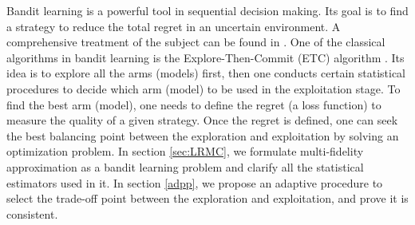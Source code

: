 \documentclass[a4paper,11pt]{article}
\numberwithin{equation}{section}
\theoremstyle{plain}
\theoremstyle{definition}
\begin{document}
Bandit learning is a powerful tool in sequential decision making.
Its goal is to find a strategy to reduce the total regret in an uncertain environment. 
A comprehensive treatment of the subject can be found in \cite{lattimore2020bandit}.
One of the classical algorithms in bandit learning is the Explore-Then-Commit (ETC) algorithm \cite[Chapter 6]{lattimore2020bandit}. Its idea is to explore all the arms (models) first, then one conducts certain statistical procedures to decide which arm (model) to be used in the exploitation stage. 
To find the best arm (model), one needs to define the regret (a loss function) to measure the quality of a given strategy. 
Once the regret is defined, one can seek the best balancing point between the exploration and exploitation by solving an optimization problem. 
In section \ref{sec:LRMC}, we formulate multi-fidelity approximation as a bandit learning problem and clarify all the statistical estimators used in it.
In section \ref{adpp}, we propose an adaptive procedure to select the trade-off point between the exploration and exploitation, and prove it is consistent.  
\end{document}

